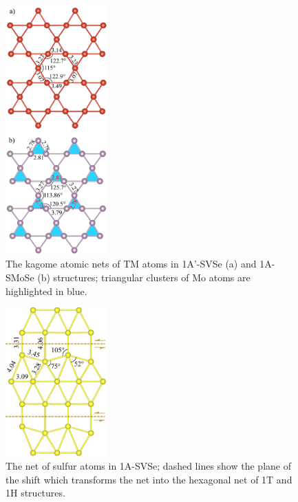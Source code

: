 \documentclass[a4paperm]{article}
\begin{document}
\begin{figure}
	\includegraphics [width=0.35\textwidth]{airss1_tm.png}
	\caption{The kagome atomic nets of TM atoms in 1A'-SVSe (a) and 1A-SMoSe (b) structures; triangular clusters of Mo atoms are highlighted in blue.} 
\label{airss1_tm}
\end{figure}

\begin{figure}
	\includegraphics[width=0.35\textwidth]{airss1v_s.png}
	\caption{The net of sulfur atoms in 1A-SVSe; dashed lines show the plane of the shift which transforms the net into the hexagonal net of 1T and 1H structures.}
\label{airss1_s}
\end{figure}
\end{document}
